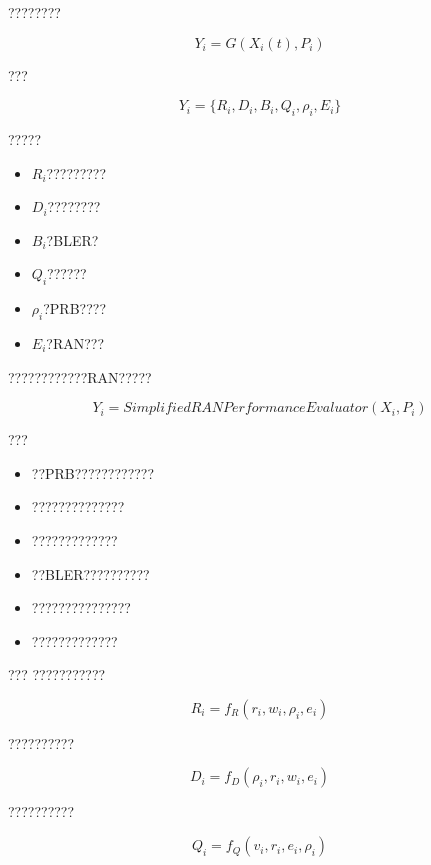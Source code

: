 ????????

\begin{equation}
Y_i
=
G
(
X_i(t),
P_i
)
\end{equation}

???

\begin{equation}
Y_i
=
\{
R_i,
D_i,
B_i,
Q_i,
\rho_i,
E_i
\}
\end{equation}

?????

\begin{itemize}
    \item $R_i$?????????
    \item $D_i$????????
    \item $B_i$?BLER?
    \item $Q_i$??????
    \item $\rho_i$?PRB????
    \item $E_i$?RAN???
\end{itemize}


????????????RAN?????

\begin{equation}
Y_i
=
SimplifiedRANPerformanceEvaluator
(
X_i,
P_i
)
\end{equation}


???

\begin{itemize}
    \item ??PRB????????????
    \item ??????????????
    \item ?????????????
    \item ??BLER??????????
    \item ???????????????
    \item ?????????????
\end{itemize}


???
???????????

\begin{equation}
R_i
=
f_R
(
r_i,w_i,\rho_i,e_i
)
\end{equation}


??????????

\begin{equation}
D_i
=
f_D
(
\rho_i,r_i,w_i,e_i
)
\end{equation}


??????????

\begin{equation}
Q_i
=
f_Q
(
v_i,r_i,e_i,\rho_i
)
\end{equation}


